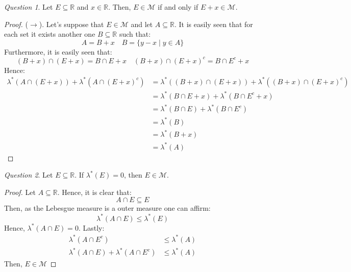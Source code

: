 \documentclass[11pt]{article}
\theoremstyle{definition}
\theoremstyle{remark}
\theoremstyle{remark}
\newtheorem{question}{Question}
\newcommand{\R}{{\mathbb{R}}}
\begin{document}
\begin{question}
  Let $E \subseteq \R$ and $x \in \R$. Then, $E \in \mathcal{M}$ if
  and only if $E + x \in \mathcal{M}$.
\end{question}
\begin{proof}
  ($\rightarrow$). Let's suppose that $E \in \mathcal{M}$ and let
  $A \subseteq \R$. It is easily seen that for each set it exists another
  one $B \subseteq \R$ such that:
  \begin{equation*}
    A = B + x \quad B = \{y - x \mid y \in A\}
  \end{equation*}
  Furthermore, it is easily seen that:
  \begin{equation*}
    (B + x)\cap(E + x) = B\cap E + x \quad (B+x) \cap (E+x)^c = B\cap E^c + x
  \end{equation*}
  Hence:
  \begin{align*}
    \lambda^*(A \cap (E+x)) + \lambda^*(A \cap (E+x)^c)
    &= \lambda^*((B + x)\cap(E + x)) + \lambda^*((B+x) \cap (E + x)^c) \\
    &= \lambda^*(B\cap E + x) + \lambda^*(B\cap E^c + x) \\
    &= \lambda^*(B\cap E) + \lambda^*(B \cap E^c) \\
    &= \lambda^*(B) \\
    &= \lambda^*(B + x) \\
    &= \lambda^*(A)
  \end{align*}
\end{proof}

\begin{question}
  Let $E \subseteq \R$. If $\lambda^*(E) = 0$, then $E \in \mathcal{M}$.
\end{question}
\begin{proof}
  Let $A \subseteq \R$. Hence, it is clear that:
  \begin{equation*}
    A \cap E \subseteq E
  \end{equation*}
  Then, as the Lebesgue measure is a outer measure one can affirm:
  \begin{equation*}
    \lambda^*(A \cap E) \le \lambda^*(E)
  \end{equation*}
  Hence, $ \lambda^*(A \cap E) = 0$. Lastly:
  \begin{align*}
    \lambda^*(A \cap E^c) &\le \lambda^*(A) \\
    \lambda^*(A \cap E) + \lambda^*(A \cap E^c) &\le \lambda^*(A)
  \end{align*}
  Then, $E \in \mathcal{M}$
\end{proof}
\end{document}
